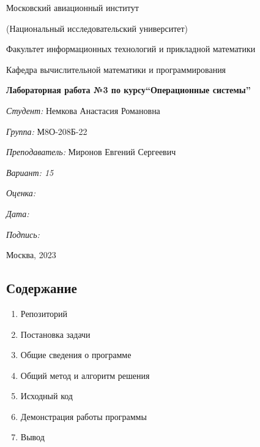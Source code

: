 \documentclass[a4paper, 14pt]{article}
\begin{document}
\thispagestyle{empty}	
\begin{center}
	Московский авиационный институт
	
	(Национальный исследовательский университет)
	
	Факультет информационных технологий и прикладной математики
	
	Кафедра вычислительной математики и программирования
	
\end{center}
\vspace{40ex}
\begin{center}
	\textbf{\large{Лабораторная работа №3 по курсу\linebreak \textquotedblleft Операционные системы\textquotedblright}}
\end{center}
\vspace{35ex}
\begin{flushright}
	\textit{Студент: } Немкова Анастасия Романовна
	
	\vspace{2ex}
	\textit{Группа: } М8О-208Б-22
	
	\vspace{2ex}
	\textit{Преподаватель: } Миронов Евгений Сергеевич
	
	\vspace{2ex}
	\textit{Вариант: 15} 
	
	\vspace{2ex}
	\textit{Оценка: } \underline{\quad\quad\quad\quad\quad\quad}
	
	 \vspace{2ex}
	\textit{Дата: } \underline{\quad\quad\quad\quad\quad\quad}
	
	\vspace{2ex}
	\textit{Подпись: } \underline{\quad\quad\quad\quad\quad\quad}
	
\end{flushright}

\vspace{5ex}

\begin{vfill}
	\begin{center}
		Москва, 2023
	\end{center}	
\end{vfill}
\newpage

\begin{center}
\section*{Содержание}   
\end{center}
\vspace{5ex}
\begin{enumerate}
  \item Репозиторий
  \item Постановка задачи
  \item Общие сведения о программе
  \item Общий метод и алгоритм решения
  \item Исходный код
  \item Демонстрация работы программы
  \item Вывод
\end{enumerate}
\newpage
\end{document}
